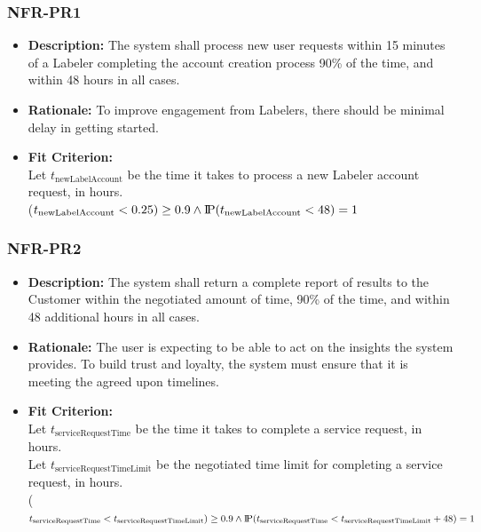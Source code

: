 \documentclass[12pt]{article}
\newcommand{\probP}{\text{I\kern-0.15em P}}
\begin{document}
\subsubsection*{NFR-PR1}
\begin{itemize}
  \item \textbf{Description:} The system shall process new user requests within 15 minutes of a Labeler  completing the account creation process 90\% of the time, and within 48 hours in all cases. 
  \item \textbf{Rationale:} To improve engagement from Labelers, there should be minimal delay in getting started.
  \item \textbf{Fit Criterion:}\\ Let $t_{\text{newLabelAccount}}$ be the time it takes to process a new Labeler account request, in hours.\\ \probP($t_{\text{newLabelAccount}} < 0.25) \geq 0.9 \wedge \probP(t_{\text{newLabelAccount}} < 48) = 1 $
\end{itemize}

\subsubsection*{NFR-PR2}
\begin{itemize}
  \item \textbf{Description:} The system shall return a complete report of results to the Customer within the negotiated amount of time, 90\% of the time, and within 48 additional hours in all cases.
  \item \textbf{Rationale:} The user is expecting to be able to act on the insights the system provides. To build trust and loyalty, the system must ensure that it is meeting the agreed upon timelines.
  \item \textbf{Fit Criterion:}\\ Let $t_{\text{serviceRequestTime}}$ be the time it takes to complete a service request, in hours.\\
  Let $t_{\text{serviceRequestTimeLimit}}$ be the negotiated time limit for completing a service request, in hours.\\ \probP($t_{\text{serviceRequestTime}} < t_{\text{serviceRequestTimeLimit}}) \geq 0.9\\ \wedge \probP(t_{\text{serviceRequestTime}} < t_{\text{serviceRequestTimeLimit}}+48) = 1 $
\end{itemize}
\end{document}
